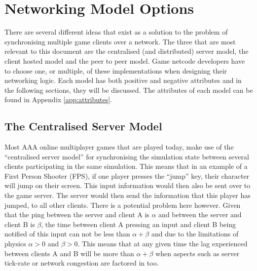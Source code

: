\newpage
\section{Networking Model Options}
There are several different ideas that exist as a solution to the problem of synchronising multiple game clients over a network. The three that are most relevant to this document are the centralised (and distributed) server model, the client hosted model and the peer to peer model. Game netcode developers have to choose one, or multiple, of these implementations when designing their networking logic. Each model has both positive and negative attributes and in the following sections, they will be discussed. The attributes of each model can be found in Appendix \ref{app:attributes}.


\subsection{The Centralised Server Model}
Most AAA online multiplayer games that are played today, make use of the ``centralised server model'' for synchronising the simulation state between several clients participating in the same simulation. This means that in an example of a First Person Shooter (FPS), if one player presses the ``jump'' key, their character will jump on their screen. This input information would then also be sent over to the game server. The server would then send the information that this player has jumped, to all other clients. There is a potential problem here however. Given that the ping between the server and client A is \(\alpha\) and between the server and client B is \(\beta\), the time between client A pressing an input and client B being notified of this input can not be less than $\alpha+\beta$ and due to the limitations of physics $\alpha>0$ and $\beta>0$. This means that at any given time the lag experienced between clients A and B will be more than $\alpha+\beta$ when aspects such as server tick-rate or network congestion are factored in too.


